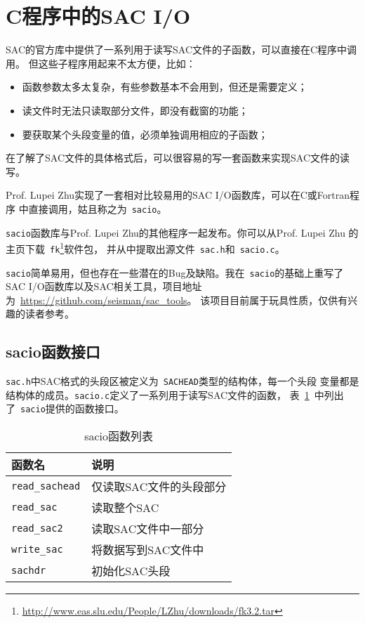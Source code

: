 \section{C程序中的SAC I/O}
SAC的官方库中提供了一系列用于读写SAC文件的子函数，可以直接在C程序中调用。
但这些子程序用起来不太方便，比如：
\begin{itemize}
\item 函数参数太多太复杂，有些参数基本不会用到，但还是需要定义；
\item 读文件时无法只读取部分文件，即没有截窗的功能；
\item 要获取某个头段变量的值，必须单独调用相应的子函数；
\end{itemize}

在了解了SAC文件的具体格式后，可以很容易的写一套函数来实现SAC文件的读写。

Prof. Lupei Zhu实现了一套相对比较易用的SAC I/O函数库，可以在C或Fortran程序
中直接调用，姑且称之为~\verb+sacio+。

\verb+sacio+函数库与Prof. Lupei Zhu的其他程序一起发布。你可以从Prof. Lupei Zhu
的主页下载~\verb+fk+\footnote{\url{http://www.eas.slu.edu/People/LZhu/downloads/fk3.2.tar}}软件包，
并从中提取出源文件~\verb+sac.h+和~\verb+sacio.c+。

\verb+sacio+简单易用，但也存在一些潜在的Bug及缺陷。我在~\verb+sacio+的基础上重写了
SAC I/O函数库以及SAC相关工具，项目地址为~\url{https://github.com/seisman/sac_tools}。
该项目目前属于玩具性质，仅供有兴趣的读者参考。

\subsection{sacio函数接口}
\verb+sac.h+中SAC格式的头段区被定义为~\verb+SACHEAD+类型的结构体，每一个头段
变量都是结构体的成员。\verb+sacio.c+定义了一系列用于读写SAC文件的函数，
表~\ref{table:sacio-function}~中列出了~\verb+sacio+提供的函数接口。

\begin{table}[H]
\centering
\caption{sacio函数列表}
\label{table:sacio-function}
\begin{tabular}{ll}
\toprule
函数名      &   说明        \\
\midrule
\verb+read_sachead+     &   仅读取SAC文件的头段部分 \\
\verb+read_sac+         &   读取整个SAC \\
\verb+read_sac2+        &   读取SAC文件中一部分 \\
\verb+write_sac+        &   将数据写到SAC文件中 \\
\verb+sachdr+           &   初始化SAC头段\\
\bottomrule
\end{tabular}
\end{table}

